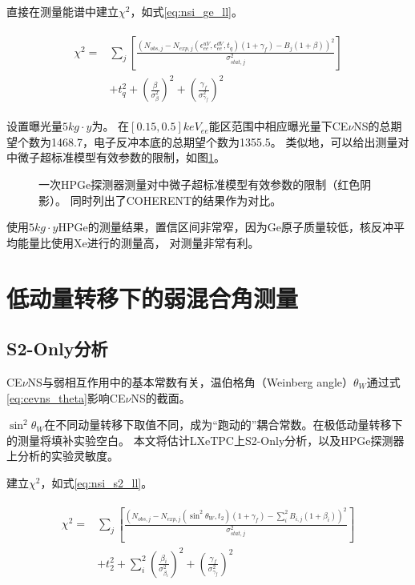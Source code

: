 直接在测量能谱中建立$\chi^2$，如式\ref{eq:nsi_ge_ll}。

\begin{align}
    \label{eq:nsi_ge_ll}
    \begin{split}
    \chi^2 =& \sum_j\left[\frac{\left(N_{obs,j} - N_{exp,j}(\epsilon^{uV}_{ee}, \epsilon^{dV}_{ee}, t_q)(1 + \gamma_f) 
    - B_{j}(1 + \beta)\right)^2}{\sigma^2_{stat,j}}\right] \\
    & + t_q^2 + (\frac{\beta}{\sigma^2_{\beta}})^2 + (\frac{\gamma_f}{\sigma^2_{\gamma_f}})^2
    \end{split}
\end{align}

设置曝光量$5\si{kg\cdot y}$为。
在$[0.15,0.5]\si{keV_{ee}}$能区范围中相应曝光量下CE$\nu$NS的总期望个数为1468.7，电子反冲本底的总期望个数为1355.5。
类似地，可以给出测量对中微子超标准模型有效参数的限制，如图\ref{fig:nsi_sensitivity_ge}。

\begin{figure}
  \centering
  
  \caption{\label{fig:nsi_sensitivity_ge} 一次HPGe探测器测量对中微子超标准模型有效参数的限制（红色阴影）。
  同时列出了COHERENT的结果作为对比\cite{akimov_observation_2017}。}
\end{figure}

使用$5\si{kg\cdot y}$HPGe的测量结果，置信区间非常窄，因为$\mathrm{Ge}$原子质量较低，核反冲平均能量比使用$\mathrm{Xe}$进行的测量高，
对测量非常有利。

\section{低动量转移下的弱混合角测量}

\subsection{S2-Only分析}

CE$\nu$NS与弱相互作用中的基本常数有关，温伯格角（Weinberg angle）$\theta_W$通过式\ref{eq:cevns_theta}影响CE$\nu$NS的截面。

$\sin^2\theta_W$在不同动量转移下取值不同，成为``跑动的''耦合常数。在极低动量转移下的测量将填补实验空白。
本文将估计LXeTPC上S2-Only分析，以及HPGe探测器上分析的实验灵敏度。

建立$\chi^2$，如式\ref{eq:nsi_s2_ll}。

\begin{align}
    \label{eq:thets_s2_ll}
    \begin{split}
    \chi^2 =& \sum_j\left[\frac{\left(N_{obs,j} - N_{exp,j}(\sin^2\theta_W, t_2)(1 + \gamma_f) 
    - \sum_{i}^2 B_{i,j}(1 + \beta_i)\right)^2}{\sigma^2_{stat,j}}\right] \\
    & + t_2^2 + \sum_{i}^2(\frac{\beta_i}{\sigma^2_{\beta_i}})^2 + (\frac{\gamma_f}{\sigma^2_{\gamma_f}})^2
    \end{split}
\end{align}

